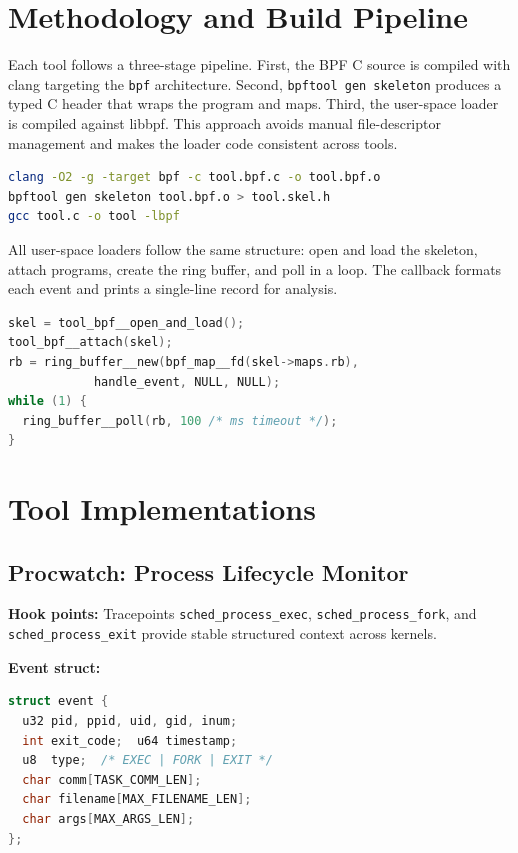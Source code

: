\documentclass[conference]{IEEEtran}
\begin{document}
\section{Methodology and Build Pipeline}
Each tool follows a three-stage pipeline. First, the BPF C source is compiled with clang targeting the \texttt{bpf} architecture. Second, \texttt{bpftool gen skeleton} produces a typed C header that wraps the program and maps. Third, the user-space loader is compiled against libbpf. This approach avoids manual file-descriptor management and makes the loader code consistent across tools.

\begin{lstlisting}[language=bash]
clang -O2 -g -target bpf -c tool.bpf.c -o tool.bpf.o
bpftool gen skeleton tool.bpf.o > tool.skel.h
gcc tool.c -o tool -lbpf
\end{lstlisting}

All user-space loaders follow the same structure: open and load the skeleton, attach programs, create the ring buffer, and poll in a loop. The callback formats each event and prints a single-line record for analysis.

\begin{lstlisting}[language=C]
skel = tool_bpf__open_and_load();
tool_bpf__attach(skel);
rb = ring_buffer__new(bpf_map__fd(skel->maps.rb),
            handle_event, NULL, NULL);
while (1) {
  ring_buffer__poll(rb, 100 /* ms timeout */);
}
\end{lstlisting}

\section{Tool Implementations}

\subsection{Procwatch: Process Lifecycle Monitor}
\textbf{Hook points:} Tracepoints \texttt{sched\_process\_exec}, \texttt{sched\_process\_fork}, and \texttt{sched\_process\_exit} provide stable structured context across kernels.

\textbf{Event struct:}
\begin{lstlisting}[language=C]
struct event {
  u32 pid, ppid, uid, gid, inum;
  int exit_code;  u64 timestamp;
  u8  type;  /* EXEC | FORK | EXIT */
  char comm[TASK_COMM_LEN];
  char filename[MAX_FILENAME_LEN];
  char args[MAX_ARGS_LEN];
};
\end{lstlisting}
\end{document}
